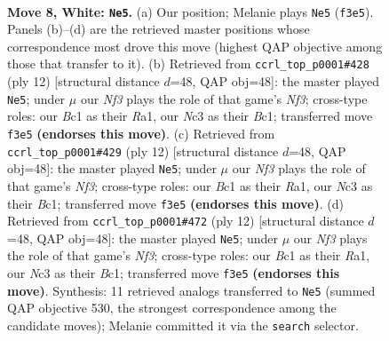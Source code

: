 \documentclass[11pt]{article}
\begin{document}
\begin{figure}[p]\centering
\begin{subfigure}{0.46\textwidth}\centering
\resizebox{\linewidth}{!}{%
\newchessgame
\chessboard[
  setfen={r1bqkb1r/pp3ppp/1np1pn2/8/2BP4/2N1PN2/PP3PPP/R1BQK2R w KQkq - 1 8},
  showmover=false,
  pgfstyle=straightmove, color=movearrow, markmove={f3-e5}
]}
\caption{}
\end{subfigure}\hfill
\begin{subfigure}{0.46\textwidth}\centering
\resizebox{\linewidth}{!}{%
\newchessgame
\chessboard[
  setfen={rnbqkb1r/p4ppp/2p1pn2/1p6/2pP4/2N2NP1/PP2PPBP/R1BQK2R w KQkq - 0 7},
  showmover=false,
  pgfstyle=straightmove, color=movearrow, markmove={f3-e5}
]}
\caption{}
\end{subfigure}
\\[4pt]
\begin{subfigure}{0.46\textwidth}\centering
\resizebox{\linewidth}{!}{%
\newchessgame
\chessboard[
  setfen={rnbqkb1r/p4ppp/2p1pn2/1p6/2pP4/2N2NP1/PP2PPBP/R1BQK2R w KQkq - 0 7},
  showmover=false,
  pgfstyle=straightmove, color=movearrow, markmove={f3-e5}
]}
\caption{}
\end{subfigure}\hfill
\begin{subfigure}{0.46\textwidth}\centering
\resizebox{\linewidth}{!}{%
\newchessgame
\chessboard[
  setfen={rnbqkb1r/p4ppp/2p1pn2/1p6/2pP4/2N2NP1/PP2PPBP/R1BQK2R w KQkq - 0 7},
  showmover=false,
  pgfstyle=straightmove, color=movearrow, markmove={f3-e5}
]}
\caption{}
\end{subfigure}
\caption{\textbf{Move 8, White: \texttt{Ne5}.} (a) Our position; Melanie plays \texttt{Ne5} (\texttt{f3e5}). Panels (b)--(d) are the retrieved master positions whose correspondence most drove this move (highest QAP objective among those that transfer to it). (b) Retrieved from \texttt{ccrl\_top\_p0001\#428} (ply 12) [structural distance $d$=48, QAP obj=48]: the master played \texttt{Ne5}; under $\mu$ our \emph{Nf3} plays the role of that game's \emph{Nf3}; cross-type roles: our \emph{B}c1 as their \emph{R}a1, our \emph{N}c3 as their \emph{B}c1; transferred move \texttt{f3e5} \textbf{(endorses this move)}. (c) Retrieved from \texttt{ccrl\_top\_p0001\#429} (ply 12) [structural distance $d$=48, QAP obj=48]: the master played \texttt{Ne5}; under $\mu$ our \emph{Nf3} plays the role of that game's \emph{Nf3}; cross-type roles: our \emph{B}c1 as their \emph{R}a1, our \emph{N}c3 as their \emph{B}c1; transferred move \texttt{f3e5} \textbf{(endorses this move)}. (d) Retrieved from \texttt{ccrl\_top\_p0001\#472} (ply 12) [structural distance $d$=48, QAP obj=48]: the master played \texttt{Ne5}; under $\mu$ our \emph{Nf3} plays the role of that game's \emph{Nf3}; cross-type roles: our \emph{B}c1 as their \emph{R}a1, our \emph{N}c3 as their \emph{B}c1; transferred move \texttt{f3e5} \textbf{(endorses this move)}. Synthesis: 11 retrieved analogs transferred to \texttt{Ne5} (summed QAP objective 530, the strongest correspondence among the candidate moves); Melanie committed it via the \texttt{search} selector.}
\label{fig:thought-m14}
\end{figure}
\end{document}
